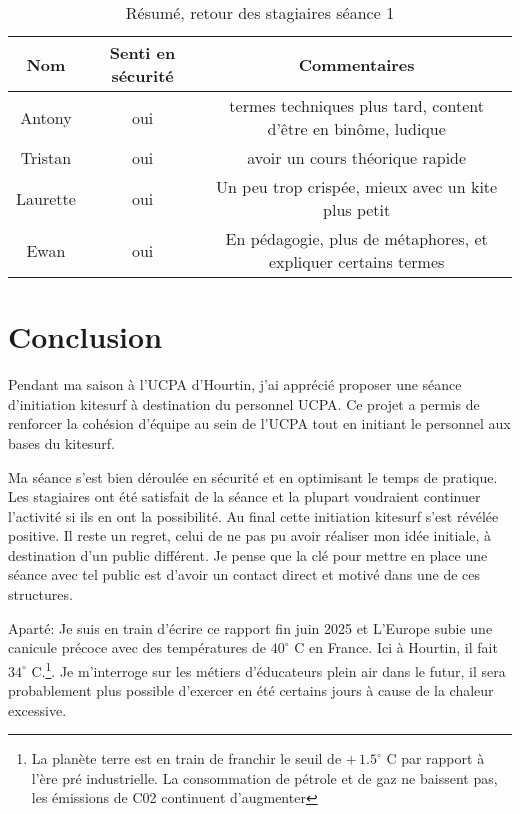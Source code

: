 \documentclass[11pt,a4paper]{report}
\begin{document}
\begin{table}
\begin{tabular}{|c|c|c|}
        \hline
        \textbf{Nom} & \textbf{Senti en sécurité} & \textbf{Commentaires} \\ 
        \hline
       Antony      &  oui    &   termes techniques plus tard, content d’être en binôme, ludique         \\
       \hline
       Tristan     &  oui    & avoir un cours théorique rapide  \\
       \hline
        Laurette   &  oui    & Un peu trop crispée, mieux avec un kite plus petit \\
        \hline
        Ewan       &  oui    & En pédagogie, plus de métaphores, et expliquer certains termes\\
        \hline
\end{tabular}
\caption{Résumé, retour des stagiaires séance 1\label{stagiaire_feedback}}
\end{table}


\FloatBarrier
\section{Conclusion}

Pendant ma saison à l'UCPA d'Hourtin, j'ai apprécié proposer une 
séance d'initiation kitesurf à destination du personnel UCPA.
Ce projet a permis de renforcer la cohésion d'équipe au sein de l'UCPA
tout en initiant le personnel aux bases du kitesurf. 

Ma séance s'est bien déroulée en sécurité et en optimisant 
le temps de pratique. Les stagiaires ont été  satisfait de la 
séance et la plupart voudraient continuer l'activité si ils en 
ont la possibilité. 
Au final cette initiation kitesurf s'est révélée  positive.
Il reste un regret, celui de ne pas pu avoir réaliser mon idée initiale, 
à destination d'un public différent. Je pense que la clé pour
mettre en place une séance avec tel public est d'avoir un contact
direct et motivé dans une de ces structures.

Aparté: Je suis en train d'écrire ce rapport fin juin 2025 et L’Europe subie
une canicule précoce avec des températures de $40^{\circ}$ C en France. Ici à Hourtin, 
il fait $34^{\circ}$ C.\footnote{
La planète terre est en train de franchir le seuil  de  $+\, 1.5^{\circ}$ C par rapport
 à l'ère pré industrielle. La consommation de pétrole et de gaz ne baissent pas, les 
émissions de C02 continuent d'augmenter\cite{giec}}.
Je m'interroge sur les métiers d'éducateurs plein air dans le futur, il sera
probablement plus possible d'exercer en été certains jours
à cause de la chaleur excessive.
\end{document}
